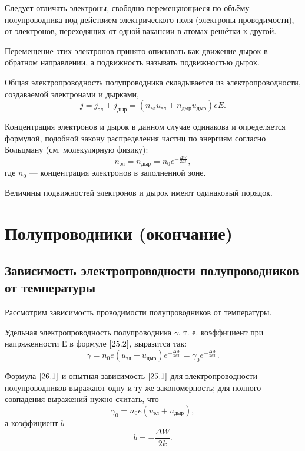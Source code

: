\documentclass[a4paper,10pt]{book}
\begin{document}
Следует отличать электроны, свободно перемещающиеся по объёму полупроводника под действием электрического поля (электроны проводимости), от электронов, переходящих от одной вакансии в атомах решётки к другой.

Перемещение этих электронов принято описывать как движение дырок в обратном направлении, а подвижность называть подвижностью дырок.

Общая электропроводность полупроводника складывается из электропроводности, создаваемой электронами и дырками,\begin{equation}\label{25.2}
j = j_{\text{эл}} + j_{\text{дыр}} = (n_{\text{эл}}u_{\text{эл}} + n_{\text{дыр}}u_{\text{дыр}})eE.
\end{equation}

Концентрация электронов и дырок в данном случае одинакова и определяется формулой, подобной закону распределения частиц по энергиям согласно Больцману (см. молекулярную физику):
\begin{equation}\label{25.3}
n_{\text{эл}} = n_{\text{дыр}} =  n_0 e^{-\frac{\Delta W}{2kT}},
\end{equation}
где $n_0$ — концентрация электронов в заполненной зоне.

Величины подвижностей электронов и дырок имеют одинаковый порядок.

\chapter{Полупроводники (окончание)}
\section{Зависимость электропроводности полупроводников от температуры}

Рассмотрим зависимость проводимости полупроводников от температуры.

Удельная электропроводность полупроводника $\gamma$, т. е. коэффициент при напряженности $Е$ в формуле $\ref{25.2}$, выразится так:
\begin{equation}\label{26.1}
\gamma = n_0 e(u_{\text{эл}} + u_{\text{дыр}})e^{-\frac{\Delta W}{2kT}}=\gamma_0 e^{-\frac{\Delta W}{2kT}}.
\end{equation}

Формула $\ref{26.1}$ и опытная зависимость $\ref{25.1}$ для электропроводности полупроводников выражают одну и ту же закономерность; для полного совпадения выражений нужно считать, что
\begin{equation}\label{26.2}
\gamma_0 = n_0 e(u_{\text{эл}} + u_{\text{дыр}}),
\end{equation}а коэффициент $b$
\begin{equation}\label{26.3}
b = -\frac{\Delta W}{2k}.
\end{equation}
\end{document}
